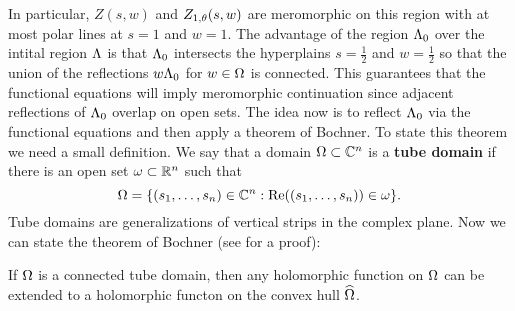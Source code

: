\documentclass[12pt,reqno,oneside]{amsart}
\begin{document}
    \begin{center}
    \end{center}
    
    In particular, $Z(s,w)$ and $Z_{1,\theta}(s,w)$ are meromorphic on this region with at most polar lines at $s = 1$ and $w = 1$. The advantage of the region $\Lambda_{0}$ over the intital region $\Lambda$ is that $\Lambda_{0}$ intersects the hyperplains $s = \frac{1}{2}$ and $w = \frac{1}{2}$ so that the union of the reflections $w\Lambda_{0}$ for $w \in \Omega$ is connected. This guarantees that the functional equations will imply meromorphic continuation since adjacent reflections of $\Lambda_{0}$ overlap on open sets. The idea now is to reflect $\Lambda_{0}$ via the functional equations and then apply a theorem of Bochner. To state this theorem we need a small definition. We say that a domain $\Omega \subset \mathbb{C}^{n}$ is a \textbf{tube domain} if there is an open set $\omega \subset \mathbb{R}^{n}$ such that
    \[
        \Omega = \{(s_{1},\ldots,s_{n}) \in \mathbb{C}^{n}:\mathrm{Re}((s_{1},\ldots,s_{n})) \in \omega\}.
    \]
    Tube domains are generalizations of vertical strips in the complex plane. Now we can state the theorem of Bochner (see \cite{hormander2000introduction} for a proof):

    \begin{theorem}
        If $\Omega$ is a connected tube domain, then any holomorphic function on $\Omega$ can be extended to a holomorphic functon on the convex hull $\widehat{\Omega}$.
    \end{theorem}
\end{document}
